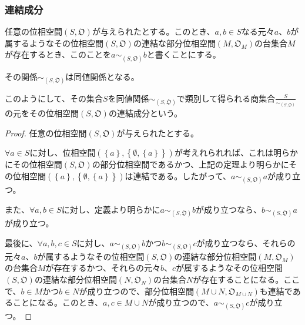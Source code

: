 \documentclass[dvipdfmx]{jsarticle}
\begin{document}
\subsubsection{連結成分}%
\begin{dfn}
任意の位相空間$\left( S,\mathfrak{O} \right)$が与えられたとする。このとき、$a,b \in S$なる元々$a$、$b$が属するようなその位相空間$\left( S,\mathfrak{O} \right)$の連結な部分位相空間$\left( M,\mathfrak{O}_{M} \right)$の台集合$M$が存在するとき、このことを$a \sim_{\left( S,\mathfrak{O} \right)}b$と書くことにする。
\end{dfn}
\begin{thm}\label{8.1.5.8}
その関係$\sim_{\left( S,\mathfrak{O} \right)}$は同値関係となる。\par
このようにして、その集合$S$を同値関係$\sim_{\left( S,\mathfrak{O} \right)}$で類別して得られる商集合$\frac{S}{\sim_{\left( S,\mathfrak{O} \right)}}$の元をその位相空間$\left( S,\mathfrak{O} \right)$の連結成分という。
\end{thm}
\begin{proof}
任意の位相空間$\left( S,\mathfrak{O} \right)$が与えられたとする。\par
$\forall a \in S$に対し、位相空間$\left( \left\{ a \right\},\left\{ \emptyset,\left\{ a \right\} \right\} \right)$が考えれられれば、これは明らかにその位相空間$\left( S,\mathfrak{O} \right)$の部分位相空間であるかつ、上記の定理より明らかにその位相空間$\left( \left\{ a \right\},\left\{ \emptyset,\left\{ a \right\} \right\} \right)$は連結である。したがって、$a \sim_{\left( S,\mathfrak{O} \right)}a$が成り立つ。\par
また、$\forall a,b \in S$に対し、定義より明らかに$a \sim_{\left( S,\mathfrak{O} \right)}b$が成り立つなら、$b \sim_{\left( S,\mathfrak{O} \right)}a$が成り立つ。\par
最後に、$\forall a,b,c \in S$に対し、$a \sim_{\left( S,\mathfrak{O} \right)}b$かつ$b \sim_{\left( S,\mathfrak{O} \right)}c$が成り立つなら、それらの元々$a$、$b$が属するようなその位相空間$\left( S,\mathfrak{O} \right)$の連結な部分位相空間$\left( M,\mathfrak{O}_{M} \right)$の台集合$M$が存在するかつ、それらの元々$b$、$c$が属するようなその位相空間$\left( S,\mathfrak{O} \right)$の連結な部分位相空間$\left( N,\mathfrak{O}_{N} \right)$の台集合$N$が存在することになる。ここで、$b \in M$かつ$b \in N$が成り立つので、部分位相空間$\left( M \cup N,\mathfrak{O}_{M \cup N} \right)$も連結であることになる。このとき、$a,c \in M \cup N$が成り立つので、$a \sim_{\left( S,\mathfrak{O} \right)}c$が成り立つ。
\end{proof}
\end{document}
